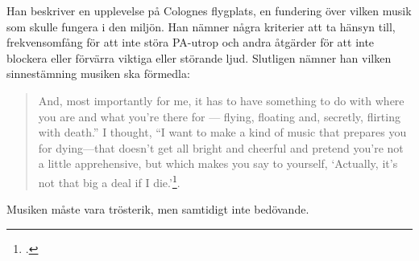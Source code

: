 \documentclass{article}
\begin{document}
Han beskriver en upplevelse på Colognes flygplats, en fundering över vilken musik som skulle fungera i den
miljön. Han nämner några kriterier att ta hänsyn till, frekvensomfång för att inte störa PA-utrop och andra
åtgärder för att inte blockera eller förvärra viktiga eller störande ljud. Slutligen nämner han vilken
sinnestämning musiken ska förmedla:

\begin{quote}
And, most importantly for me, it has to have
something to do with where you are and what you’re there for — flying, floating and, secretly, flirting with
death.” I thought, “I want to make a kind of music that prepares you for dying—that doesn’t get all bright and
cheerful and pretend you’re not a little apprehensive, but which makes you say to yourself, ‘Actually, it’s
not that big a deal if I die.’\footcite[152]{Eno}.
\end{quote}

Musiken måste vara trösterik, men samtidigt inte bedövande.











\end{document}
